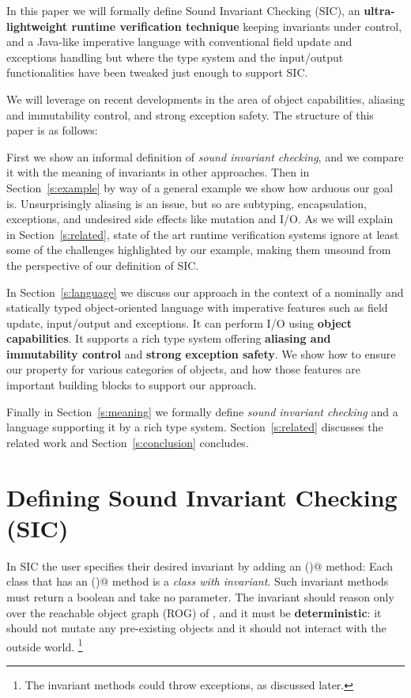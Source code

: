 In this paper we will formally define  Sound Invariant Checking (SIC), an \textbf{ultra-lightweight runtime verification technique} 
 keeping invariants under control, and 
 a Java-like imperative language
 with conventional field update and exceptions handling
 but where the type system and the input/output functionalities
 have been tweaked just enough to support SIC.
 
 We will leverage on recent developments in the area of object capabilities, aliasing and immutability control, and strong exception safety.
The structure of this paper is as follows:

First we show an informal definition of \emph{sound invariant checking}, and we compare it with 
the meaning of invariants in other approaches.
Then in Section~\ref{s:example} by way of a general example we show how arduous our goal is.
Unsurprisingly aliasing is an issue, but so are subtyping, encapsulation, exceptions, and undesired side effects like mutation and I/O.
As we will explain in Section~\ref{s:related}, state of the art runtime verification systems
ignore at least some of the challenges highlighted by our example,
making them unsound from the perspective of our definition of SIC.



In Section~\ref{s:language} we discuss our approach in the context of
a nominally and statically typed object-oriented language with
imperative features such as field update, input/output and exceptions.
It can perform I/O using  \textbf{object capabilities}.
It supports a rich type system offering \textbf{aliasing and immutability control} and \textbf{strong exception safety}.
We show how to ensure our property for various categories of objects, and 
how those features are important building blocks to support our approach.

Finally in Section~\ref{s:meaning} we formally define \emph{sound invariant checking} and
a language supporting it by a rich type system.
 Section~\ref{s:related} discusses the related work and Section~\ref{s:conclusion} concludes.



\saveSpace\saveSpace
\section{Defining Sound Invariant Checking (SIC)}
\label{s:def}
\saveSpace
In SIC the user specifies their desired invariant by adding an \Q@invariant()@ method:
Each class that has an \Q@invariant()@ method is a
\emph{class with invariant}.
Such invariant methods must return a boolean and take no parameter.
The invariant should reason only over the reachable object graph (ROG) of \Q@this@, and
it must be \textbf{deterministic}:
it should not mutate any pre-existing objects and it should not interact with the outside world.%
\footnote{The invariant methods could throw exceptions, as discussed later.}

